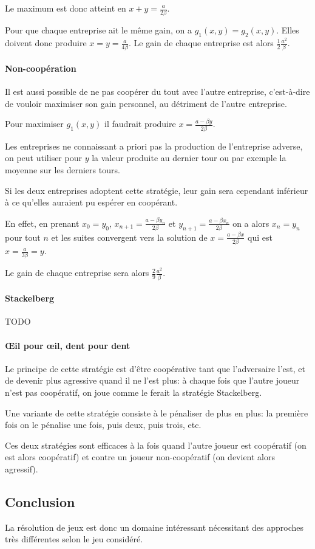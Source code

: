       Le maximum est donc atteint en $x+y=\frac a {2\beta}$.

      Pour que chaque entreprise ait le même gain, on a $g_1(x, y) = g_2(x, y)$.
      Elles doivent donc produire $x=y=\frac a {4\beta}$. Le gain de chaque
      entreprise est alors $\frac 1 2 \frac {a^2} \beta$.

    \paragraph{Non-coopération} Il est aussi possible de ne pas coopérer du
      tout avec l'autre entreprise, c'est-à-dire de vouloir maximiser son gain
      personnel, au détriment de l'autre entreprise.

      Pour maximiser $g_1(x, y)$ il faudrait produire
      $x=\frac {a-\beta y} {2\beta}$.
      
      Les entreprises ne connaissant a priori pas la production de l'entreprise
      adverse, on peut utiliser pour $y$ la valeur produite au dernier tour ou
      par exemple la moyenne sur les derniers tours.

      Si les deux entreprises adoptent cette stratégie, leur gain sera
      cependant inférieur à ce qu'elles auraient pu espérer en coopérant.

      En effet, en prenant $x_0 = y_0$, $x_{n+1}=\frac {a-\beta y_n} {2\beta}$
      et $y_{n+1}=\frac {a-\beta x_n} {2\beta}$ on a alors $x_n=y_n$ pour tout
      $n$ et les suites convergent vers la solution de
      $x=\frac {a-\beta x} {2\beta}$ qui est $x=\frac a {3\beta}=y$.

      Le gain de chaque entreprise sera alors $\frac 2 9 \frac {a^2} \beta$.

    \paragraph{Stackelberg}
      TODO

    \paragraph{Œil pour œil, dent pour dent}
      Le principe de cette stratégie est d'être coopérative tant que
      l'adversaire l'est, et de devenir plus agressive quand il ne l'est plus:
      à chaque fois que l'autre joueur n'est pas coopératif, on joue comme le
      ferait la stratégie Stackelberg.

      Une variante de cette stratégie consiste à le pénaliser de plus en plus:
      la première fois on le pénalise une fois, puis deux, puis trois, etc.

      Ces deux stratégies sont efficaces à la fois quand l'autre joueur est
      coopératif (on est alors coopératif) et contre un joueur non-coopératif
      (on devient alors agressif).

\subsection{Conclusion}
  La résolution de jeux est donc un domaine intéressant nécessitant des
  approches très différentes selon le jeu considéré.
